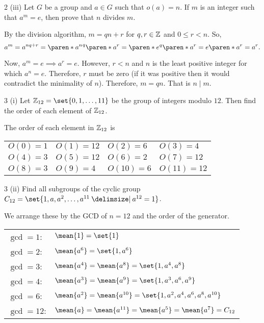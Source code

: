 \documentclass[11pt]{penrose}
\let\cyclic\mean
\begin{document}
\begin{problem}{2 (iii)}
    Let $G$ be a group and $a \in G$ such that $o(a) = n$. If $m$ is an integer such that $a^m = e$, then prove that $n$ divides $m$.

    \solution By the division algorithm, $m = qn + r$ for $q, r \in \mathbb{Z}$ and $0 \leq r < n$. So,
    \begin{equation*}
        a^m = a^{nq + r} = \paren*{{a^n}^q} \paren*{a^r} = \paren*{e^q} \paren*{a^r} = e \paren*{a^r} = a^r.
    \end{equation*}

    Now, $a^m = e \implies a^r = e$. However, $r < n$ and $n$ is the least positive integer for which $a^n = e$. Therefore, $r$ must be zero (if it was positive then it would contradict the minimality of $n$). Therefore, $m = qn$. That is $n \mid m$.
\end{problem}

\begin{problem}{3 (i)}
    Let $\Z_{12} = \set{0, 1, \dots, 11}$ be the group of integers modulo $12$. Then find the order of each element of $\mathbb{Z}_{12}$.

    \solution The order of each element in $\mathbb{Z}_{12}$ is
    \begin{center}
    \begin{tabularx}{0.8\textwidth}{XXXX}
        $O(0)  =  1$ & $O(1)  = 12$ & $O(2)  =  6$ & $O(3)  =  4$\\
        $O(4)  =  3$ & $O(5)  = 12$ & $O(6)  =  2$ & $O(7)  = 12$\\
        $O(8)  =  3$ & $O(9)  =  4$ & $O(10) =  6$ & $O(11) = 12$\\
    \end{tabularx}
    \end{center}
\end{problem}

\begin{problem}{3 (ii)}
    Find all subgroups of the cyclic group $C_{12} = \set{1, a, a^2, \dots, a^{11} \st a^{12}=1}$.

    \solution We arrange these by the GCD of $n = 12$ and the order of the generator.
    \begin{center}
    \begin{tabularx}{0.8\textwidth}{p{20mm}L}
        $\gcd = 1$: & $\cyclic{1} = \set{1}$\\
        $\gcd = 2$: & $\cyclic{a^6} = \set{1, a^6}$\\
        $\gcd = 3$: & $\cyclic{a^4} = \cyclic{a^8} = \set{1, a^4, a^8}$\\
        $\gcd = 4$: & $\cyclic{a^3} = \cyclic{a^9} = \set{1, a^3, a^6, a^9}$\\
        $\gcd = 6$: & $\cyclic{a^2} = \cyclic{a^{10}} = \set{1, a^2, a^4, a^6, a^8, a^{10}}$\\
        $\gcd = 12$: & $\cyclic{a} = \cyclic{a^{11}} = \cyclic{a^5} = \cyclic{a^7} = C_{12}$\\
    \end{tabularx}
    \end{center}
\end{problem}
\end{document}

